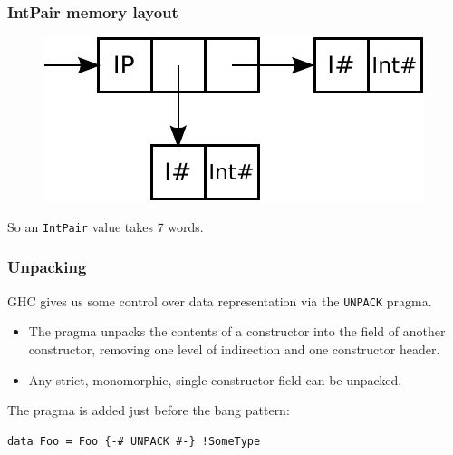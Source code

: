 \documentclass{beamer}
\begin{document}
\begin{frame}[fragile]
  \frametitle{IntPair memory layout}

  \begin{figure}
    \includegraphics[scale=0.75]{diagrams/intpair.pdf}
  \end{figure}
  So an \lstinline!IntPair! value takes 7 words.
\end{frame}

\begin{frame}[fragile]
  \frametitle{Unpacking}

  GHC gives us some control over data representation via the
  \lstinline!UNPACK! pragma.

  \begin{itemize}
  \item The pragma unpacks the contents of a constructor into the
    field of another constructor, removing one level of indirection
    and one constructor header.
  \item Any strict, monomorphic, single-constructor field can be
    unpacked.
  \end{itemize}

  The pragma is added just before the bang pattern:

  \begin{lstlisting}
data Foo = Foo {-# UNPACK #-} !SomeType
  \end{lstlisting}
\end{frame}
\end{document}
